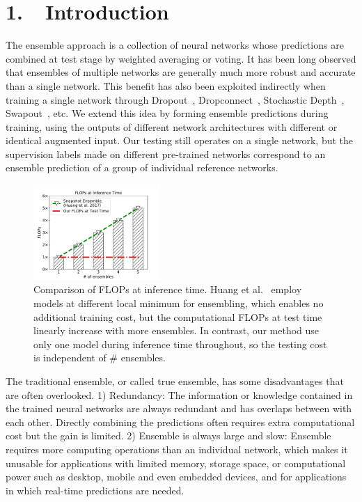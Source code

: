 \documentclass[letterpaper]{article} %
\begin{document}
\section{1.~~Introduction}

The ensemble approach is a collection of neural networks whose predictions are combined at test stage by weighted averaging or voting.
It has been long observed that ensembles of multiple networks are generally much more robust and accurate than a single network. This benefit has also been exploited indirectly when training a single network through Dropout~\cite{srivastava2014dropout}, Dropconnect~\cite{wan2013regularization}, Stochastic Depth~\cite{huang2016deep}, Swapout~\cite{singh2016swapout}, etc. We extend this idea by forming ensemble predictions during training, using the outputs of different network architectures with different or identical augmented input. Our testing still operates on a single network, but the supervision labels made on different pre-trained networks correspond to an ensemble prediction of a group of individual reference networks.

\begin{figure}[t]
	\centering
	\includegraphics[width=0.43\textwidth]{figs/comparisons}
	\vspace{-0.10in}
	\caption{Comparison of FLOPs at inference time. Huang et al.~\cite{huang2017snapshot} employ models at different local minimum for ensembling, which enables no additional training cost, but the computational FLOPs at test time linearly increase with more ensembles. In contrast, our method use only one model during inference time throughout, so the testing cost is independent of \# ensembles.}
	\label{d}
	\vspace{-0.1in}
\end{figure}

The traditional ensemble, or called true ensemble, has some disadvantages that are often overlooked. 1) Redundancy: The information or knowledge contained in the trained neural networks are always redundant and has overlaps between with each other. Directly combining the predictions often requires extra computational cost but the gain is limited. 2) Ensemble is always large and slow: Ensemble requires more computing operations than an individual network, which makes it unusable for applications with limited memory, storage space, or computational power such as  desktop, mobile and even embedded devices, and for applications in which real-time predictions are needed.
\end{document}
